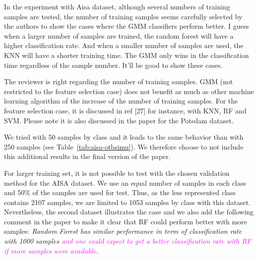 \documentclass[a4paper,10pt,DIV=16]{scrartcl}
\newcommand{\rev}[1]{\textcolor{magenta}{#1}}
\begin{document}
\begin{revbox}
  In the experiment with Aisa dataset, although several numbers of training samples are tested, the number of training samples seems carefully selected by the authors to show the cases where the GMM classifiers perform better. I guess when a larger number of samples are trained, the random forest will have a higher classification rate. And when a smaller number of samples are used, the KNN will have a shorter training time. The GMM only wins in the classification time regardless of the sample number. It’ll be good to show these cases.
  \begin{resbox}
    The reviewer is right regarding the number of training samples. GMM (not restricted to the feature selection case) does not benefit as much as other machine learning algorithm of the increase of the number of training samples. For the feature selection case, it is discussed in ref [27] for instance, with KNN, RF and SVM. Please note it is also discussed in the paper for the Potsdam dataset.
    
    We tried with 50 samples by class and it leads to the same behavior than with 250 samples (see Table~\ref{tab:aisa-otbsimu}). We therefore choose to not include this additional results in the final version of the paper.

    For larger training set,  it is not possible to test with the chosen validation method for the AISA dataset. We use an equal number of samples in each class and 50\% of the samples are used for test. Thus, as the less represented class contains 2107 samples, we are limited to 1053 samples by class with this dataset. Nevertheless, the second dataset illustrates the case and we also add the following comment in the paper to make it clear that RF could perform better with more samples:
    \emph{Random Forest has similar performance in term of classification rate with 1000 samples \rev{ and one could expect to get a better classification rate with RF if more samples were available}.}
  \end{resbox}
\end{revbox}
\end{document}
